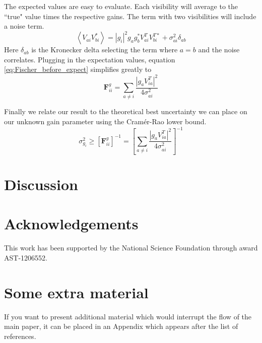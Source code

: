 \documentclass[a4paper,fleqn,usenatbib]{../mnras}
\begin{document}
The expected values are easy to evaluate. Each visibility will average to the ``true" value times the respective gains. The term with two visibilities will include a noise term.
\begin{equation}
\left<V_{ai}V_{bi}^*\right> = |g_i|^2 g_a g_b^* V_{ai}^T V_{bi}^{T*} + \sigma_{ai}^2 \delta_{ab}
\end{equation}
Here $\delta_{ab}$ is the Kronecker delta selecting the term where $a=b$ and the noise correlates. Plugging in the expectation values, equation \ref{eq:Fischer_before_expect} simplifies greatly to
\begin{equation}
\mathbf{F}^g_{ii} = \sum_{a \ne i} \frac{\left|g_a V_{ia}^T \right|^2}{4\sigma_{ai}^2}
\end{equation}

Finally we relate our result to the theoretical best uncertainty we can place on our unknown gain parameter using the Cram\'er-Rao lower bound.
\begin{equation}\label{eq:cramer_rao}
\sigma_{g_i}^2 \ge \left[ \mathbf{F}^g_{ii} \right]^{-1} = \left[ \sum_{a \ne i} \frac{\left|g_a V_{ia}^T \right|^2}{4\sigma_{ai}^2} \right]^{-1}
\end{equation}

\section{Discussion}\label{sec:discussion}

\section*{Acknowledgements}
This work has been supported by the National Science Foundation through award AST-1206552.









\appendix

\section{Some extra material}

If you want to present additional material which would interrupt the flow of the main paper,
it can be placed in an Appendix which appears after the list of references.



\bsp	%
\label{lastpage}
\end{document}
